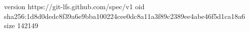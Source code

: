 version https://git-lfs.github.com/spec/v1
oid sha256:1d8d0dedc8f39a6e9bba100224cee0dc8a11a3f89c2389ee4abe46f5d1ca18a6
size 142149
